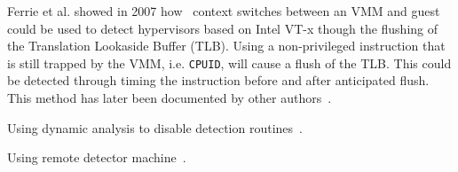 Ferrie {et al.} showed in 2007 how~\cite{ferrie2007} context switches between an
VMM and guest could be used to detect hypervisors based on Intel VT-x though the
flushing of the Translation Lookaside Buffer (TLB). Using a non-privileged
instruction that is still trapped by the VMM, i.e. {\tt CPUID}, will cause a
flush of the TLB. This could be detected through timing the instruction before
and after anticipated flush. This method has later been documented by other
authors~\cite{thompson}.

Using dynamic analysis to disable detection routines~\cite{kang2009}.

Using remote detector machine~\cite{franklin2008}.

